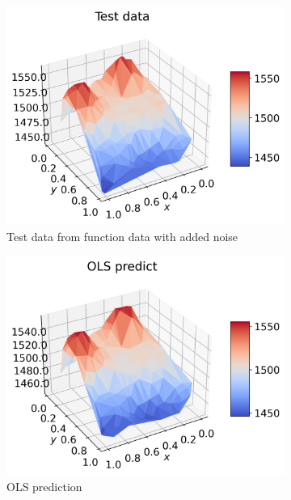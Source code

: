 \documentclass[12pt]{article}
\begin{document}
\begin{figure}[H]
  \begin{subfigure}{.5\textwidth}
    \centering
    \includegraphics[width=\textwidth]{../figures/test_data_n40_skip2.png}
    \caption{Test data from function data with added noise}
    \label{fig:real_pred_test_skip}
  \end{subfigure}
  \begin{subfigure}{.5\textwidth}
    \centering
    \includegraphics[width=\textwidth]{../figures/ols_pred_n40_skip2.png}
    \caption{OLS prediction}
    \label{fig:real_pred_ols_skip}
  \end{subfigure}
  \begin{subfigure}{.5\textwidth}

\end{subfigure}
\end{figure}
\end{document}
